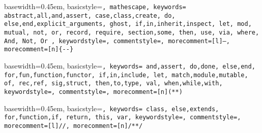 { basewidth=0.45em,
  basicstyle=\small\tt,  %
  mathescape,
  keywords={
    abstract,all,and,assert,
    case,class,create,
    do,
    else,end,explicit_arguments,
    ghost,
    if,in,inherit,inspect,
    let,
    mod,
    mutual,
    not,
    or,
    record, require,
    section,some,
    then,
    use,
    via,
    where,
    And,
    Not,
    Or
  },
  keywordstyle=\color{blue},
  commentstyle=\color{brown},
  morecomment=[l]{--},
  morecomment=[n]{\{-}{-\}}
}

 {\lstset{language=alba}} {}







{ basewidth=0.45em,
  basicstyle=\tt\small,
  keywords={
    and,assert,
    do,done,
    else,end,
    for,fun,function,functor,
    if,in,include,
    let,
    match,module,mutable,
    of,
    rec,ref,
    sig,struct,
    then,to,type,
    val,
    when,while,with},
  keywordstyle=\color{blue},
  commentstyle=\color{brown},
  morecomment=[n]{(*}{*)}
}

 {\lstset{language=ocaml}} {}





{ basewidth=0.45em,
  basicstyle=\small\tt,
  keywords={
    class,
    else,extends,
    for,function,if,
    return,
    this,
    var},
  keywordstyle=\color{blue},
  commentstyle=\color{brown},
  morecomment=[l]{//},
  morecomment=[n]{/*}{*/}
}

 {\lstset{language=js}} {}




\newcommand{\code}[1]{{\tt\small #1}}

\def\ignore#1{}

\def\vec0#1{{\vec{#1}}}
\def\vec#1{\mathbf{#1}}
\def\meta#1{{\scriptsize\raisebox{2pt}{?}}\!#1}
\def\set#1{\{#1\}}

\def\Abold{\mathbf{A}}
\def\abold{\mathbf{a}}
\def\Bbold{\mathbf{B}}
\def\bbold{\mathbf{b}}
\def\Cbold{\mathbf{C}}
\def\Dbold{\mathbf{D}}
\def\fbold{\mathbf{f}}
\def\Pbold{\mathbf{P}}
\def\pbold{\mathbf{p}}
\def\qbold{\mathbf{q}}
\def\Tbold{\mathbf{T}}
\def\tbold{\mathbf{t}}
\def\xbold{\mathbf{x}}
\def\ybold{\mathbf{y}}
\def\zbold{\mathbf{z}}


